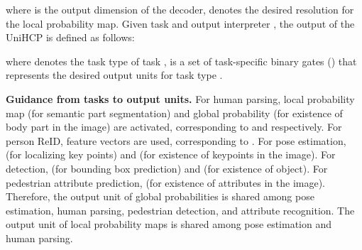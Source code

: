 \documentclass[10pt,twocolumn,letterpaper]{article}
\begin{document}
where  is the output dimension of the decoder,  denotes the desired resolution for the local probability map.
Given task  and output interpreter , the output of the UniHCP is defined as follows:

where  denotes the task type of task ,  is a set of task-specific binary gates () that represents the desired output units for task type . 

\noindent\textbf{Guidance from tasks to output units.} For human parsing, local probability map (for semantic part segmentation) and global probability (for existence
of body part in the image) are activated, corresponding to  and  respectively. For
person ReID, feature vectors are used, corresponding to . For pose estimation,  (for localizing key points) and  (for existence of keypoints in the image). For detection,  (for bounding box prediction) and  (for existence of object). For pedestrian attribute prediction,  (for existence of attributes in the image). Therefore, the output unit of global probabilities is shared among pose estimation, human parsing, pedestrian detection, and attribute recognition. The output unit of local probability maps is shared among pose estimation and human parsing.
\end{document}
